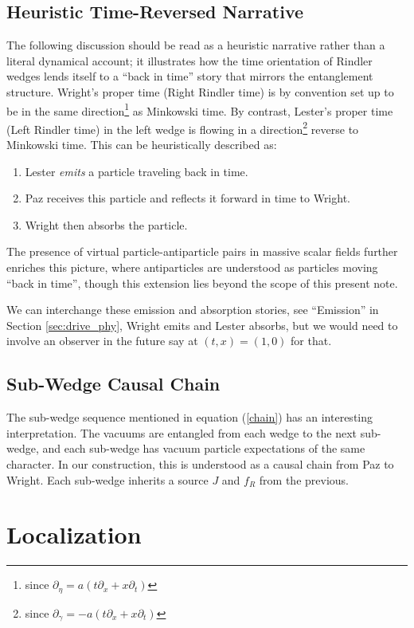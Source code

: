 \documentclass[12pt,a4paper]{article}
\begin{document}
{\subsection{Heuristic Time-Reversed Narrative} \label{sec:back_in_time}
The following discussion should be read as a heuristic narrative rather than a literal dynamical account; it illustrates how the time orientation of Rindler wedges lends itself to a “back in time” story that mirrors the entanglement structure.  Wright's proper time (Right Rindler time) is by convention set up to be in the same direction\footnote{since $\partial_\eta = a(t \partial_x + x \partial_t )$} as Minkowski time. By contrast, Lester's proper time (Left Rindler time) in the left wedge is flowing in a direction\footnote{since $\partial_\gamma = -a(t \partial_x + x \partial_t )$} reverse to Minkowski time. This can be heuristically described as:
\begin{enumerate}
\item Lester {\it emits} a particle traveling back in time.
\item Paz receives this particle and reflects it forward in time to Wright.
\item Wright then absorbs the particle.
\end{enumerate}
The presence of virtual particle-antiparticle pairs in massive scalar fields further enriches this picture, where antiparticles are understood as particles moving ``back in time'', though this extension lies beyond the scope of this present note.

We can interchange these emission and absorption stories, see ``Emission'' in Section \ref{sec:drive_phy}, Wright emits and Lester absorbs, but we would need to involve an observer in the future say at $(t,x) = (1,0)$ for that.  

\subsection{Sub-Wedge Causal Chain} \label{sec:chain_sources}

The sub-wedge sequence mentioned in equation (\ref{chain}) has an interesting interpretation.  The vacuums are entangled from each wedge to the next sub-wedge, and each sub-wedge has vacuum particle expectations of the same character. In our construction, this is understood as a causal chain from Paz to Wright.  Each sub-wedge inherits a source $J$ and $f_R$ from the previous. 

\section{Localization} \label{sec:loc}

}
\end{document}
